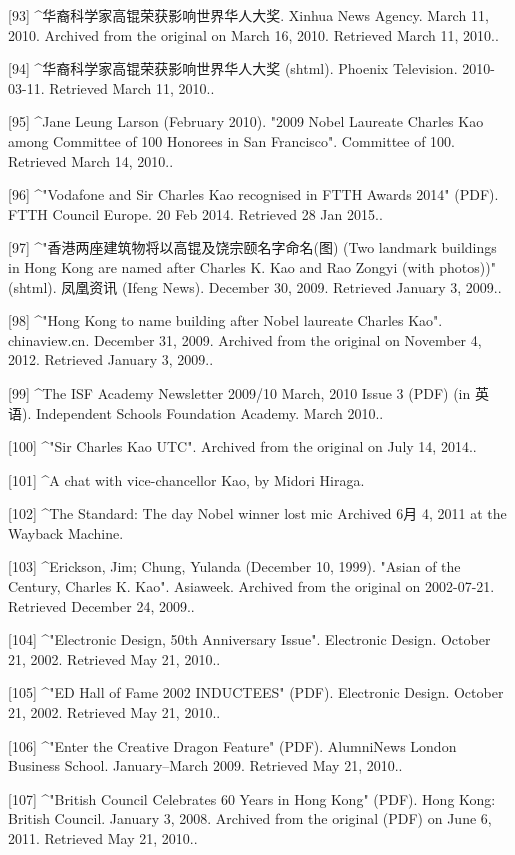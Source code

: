 [93]
^华裔科学家高锟荣获影响世界华人大奖. Xinhua News Agency. March 11, 2010. Archived from the original on March 16, 2010. Retrieved March 11, 2010..

[94]
^华裔科学家高锟荣获影响世界华人大奖 (shtml). Phoenix Television. 2010-03-11. Retrieved March 11, 2010..

[95]
^Jane Leung Larson (February 2010). "2009 Nobel Laureate Charles Kao among Committee of 100 Honorees in San Francisco". Committee of 100. Retrieved March 14, 2010..

[96]
^"Vodafone and Sir Charles Kao recognised in FTTH Awards 2014" (PDF). FTTH Council Europe. 20 Feb 2014. Retrieved 28 Jan 2015..

[97]
^"香港两座建筑物将以高锟及饶宗颐名字命名(图) (Two landmark buildings in Hong Kong are named after Charles K. Kao and Rao Zongyi (with photos))" (shtml). 凤凰资讯 (Ifeng News). December 30, 2009. Retrieved January 3, 2009..

[98]
^"Hong Kong to name building after Nobel laureate Charles Kao". chinaview.cn. December 31, 2009. Archived from the original on November 4, 2012. Retrieved January 3, 2009..

[99]
^The ISF Academy Newsletter 2009/10 March, 2010 Issue 3 (PDF) (in 英语). Independent Schools Foundation Academy. March 2010..

[100]
^"Sir Charles Kao UTC". Archived from the original on July 14, 2014..

[101]
^A chat with vice-chancellor Kao, by Midori Hiraga.

[102]
^The Standard: The day Nobel winner lost mic Archived 6月 4, 2011 at the Wayback Machine.

[103]
^Erickson, Jim; Chung, Yulanda (December 10, 1999). "Asian of the Century, Charles K. Kao". Asiaweek. Archived from the original on 2002-07-21. Retrieved December 24, 2009..

[104]
^"Electronic Design, 50th Anniversary Issue". Electronic Design. October 21, 2002. Retrieved May 21, 2010..

[105]
^"ED Hall of Fame 2002 INDUCTEES" (PDF). Electronic Design. October 21, 2002. Retrieved May 21, 2010..

[106]
^"Enter the Creative Dragon Feature" (PDF). AlumniNews London Business School. January–March 2009. Retrieved May 21, 2010..

[107]
^"British Council Celebrates 60 Years in Hong Kong" (PDF). Hong Kong: British Council. January 3, 2008. Archived from the original (PDF) on June 6, 2011. Retrieved May 21, 2010..

